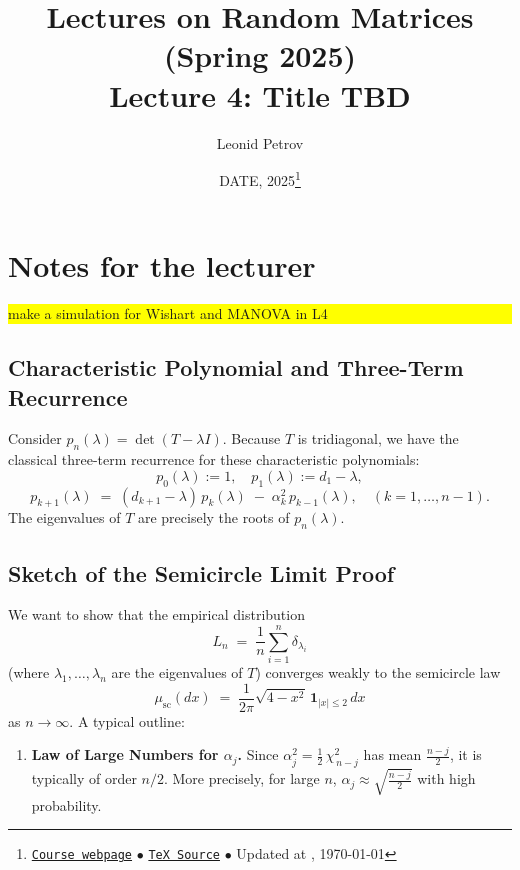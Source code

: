 \documentclass[letterpaper,11pt,oneside,reqno]{article}
\numberwithin{equation}{section}
\theoremstyle{definition}
\newenvironment{lnotes}{\section*{Notes for the lecturer}}{}
\begin{document}
\title{Lectures on Random Matrices
(Spring 2025)
\\Lecture 4: Title TBD}


\date{DATE, 2025\footnote{\href{https://lpetrov.cc/rmt25/}{\texttt{Course webpage}}
$\bullet$ \href{https://lpetrov.cc/rmt25/rmt25-notes/rmt2025-l04.tex}{\texttt{TeX Source}}
$\bullet$
Updated at \currenttime, \today}}



\author{Leonid Petrov}


\maketitle


\begin{lnotes}


	\colorbox{yellow}{\parbox{.7\textwidth}{make a simulation for Wishart and MANOVA in L4}}


\subsection{Characteristic Polynomial and Three-Term Recurrence}

Consider \(p_n(\lambda) = \det(T - \lambda I)\).  Because \(T\) is tridiagonal, we have the classical three-term recurrence for these characteristic polynomials:
\[
  p_0(\lambda) := 1,\quad
  p_1(\lambda) := d_1 - \lambda,
\]
\[
  p_{k+1}(\lambda)
  \;=\;
  (d_{k+1} - \lambda)\,p_k(\lambda)
  \;-\;\alpha_k^2\,p_{k-1}(\lambda),
  \quad
  (k=1,\dots,n-1).
\]
The eigenvalues of \(T\) are precisely the roots of \(p_n(\lambda)\).

\subsection{Sketch of the Semicircle Limit Proof}

We want to show that the empirical distribution
\[
  L_n
  \;=\;
  \frac{1}{n}\sum_{i=1}^n \delta_{\lambda_i}
\]
(where \(\lambda_1,\dots,\lambda_n\) are the eigenvalues of \(T\)) converges weakly to the semicircle law
\[
  \mu_{\mathrm{sc}}(dx)
  \;=\;
  \frac{1}{2\pi}\sqrt{4 - x^2}\,\mathbf{1}_{|x|\le 2}\,dx
\]
as \(n\to\infty\).  A typical outline:

\begin{enumerate}[1.]
\item \textbf{Law of Large Numbers for \(\alpha_j\).}
   Since \(\alpha_j^2 = \tfrac12\,\chi^2_{\,n-j}\) has mean \(\tfrac{n-j}{2}\), it is typically of order \(n/2\).  More precisely, for large \(n\), \(\alpha_j \approx \sqrt{\tfrac{n-j}{2}}\) with high probability.


\end{enumerate}
\end{lnotes}
\end{document}
